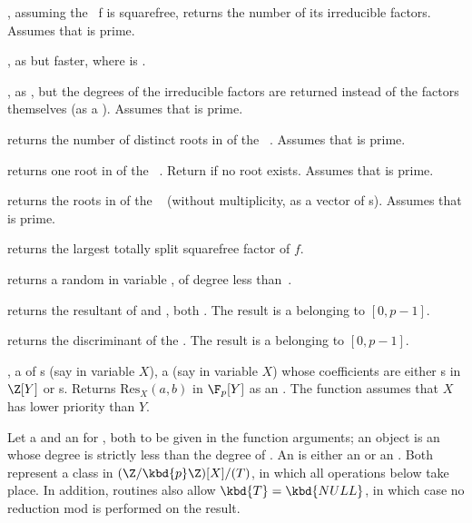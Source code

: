 , assuming the ~f is squarefree,
returns the number of its irreducible factors. Assumes that  is prime.

, as
 but faster,
where  is .

, as , but the
degrees of the irreducible factors are returned instead of the factors
themselves (as a ). Assumes that  is prime.

 returns the number of distinct
roots in  of the ~. Assumes that  is prime.

 returns one root in  of
the ~. Return  if no root exists.
Assumes that  is prime.

 returns the roots in  of
the ~ (without multiplicity, as a vector of s).
Assumes that  is prime.

 returns the largest totally split
squarefree factor of $f$.

 returns a random 
in variable , of degree less than~.

 returns the resultant
of  and , both . The result is a 
belonging to $[0,p-1]$.

 returns the discriminant
of the  . The result is a  belonging to $[0,p-1]$.

,  a  of
s (say in variable $X$),  a  (say in variable $X$)
whose coefficients are either s in $\Z[Y]$ or s.
Returns $\text{Res}_X(a, b)$ in $\F_p[Y]$ as an . The function
assumes that $X$ has lower priority than $Y$.

 Let  a  and  an
 for , both to be given in the function arguments; an 
object is an  whose degree is strictly less than the degree of
. An  is either an  or an . Both represent
a class in $(\Z/\kbd{p}\Z)[X] / (T)$, in which all operations below take
place. In addition,  routines also allow $\kbd{T} = \kbd{NULL}$, in
which case no reduction mod  is performed on the result.

